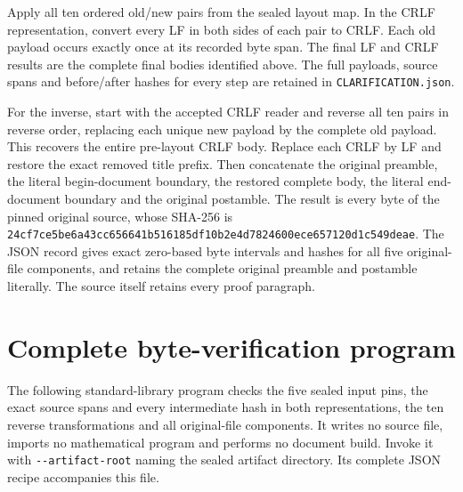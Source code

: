 \documentclass[11pt,a4paper]{article}
\begin{document}
Apply all ten ordered old/new pairs from the sealed layout map. In the
CRLF representation, convert every LF in both sides of each pair to CRLF.
Each old payload occurs exactly once at its recorded byte span. The final
LF and CRLF results are the complete final bodies identified above.
The full payloads, source spans and before/after hashes for every step are
retained in \nolinkurl{CLARIFICATION.json}.

For the inverse, start with the accepted CRLF reader and reverse all ten
pairs in reverse order, replacing each unique new payload by the complete
old payload. This recovers the entire pre-layout CRLF body. Replace each
CRLF by LF and restore the exact removed title prefix. Then concatenate
the original preamble, the literal begin-document boundary, the restored
complete body, the literal end-document boundary and the original
postamble. The result is every byte of the pinned original source,
whose SHA-256 is
\nolinkurl{24cf7ce5be6a43cc656641b516185df10b2e4d7824600ece657120d1c549deae}.
The JSON record gives exact zero-based byte intervals and hashes for all
five original-file components, and retains the complete original preamble
and postamble literally. The source itself retains every proof paragraph.

\section{Complete byte-verification program}
The following standard-library program checks the five sealed input pins,
the exact source spans and every intermediate hash in both representations,
the ten reverse transformations and all original-file components. It
writes no source file, imports no mathematical program and performs no
document build. Invoke it with \nolinkurl{--artifact-root} naming the
sealed artifact directory. Its complete JSON recipe accompanies this file.
\end{document}
